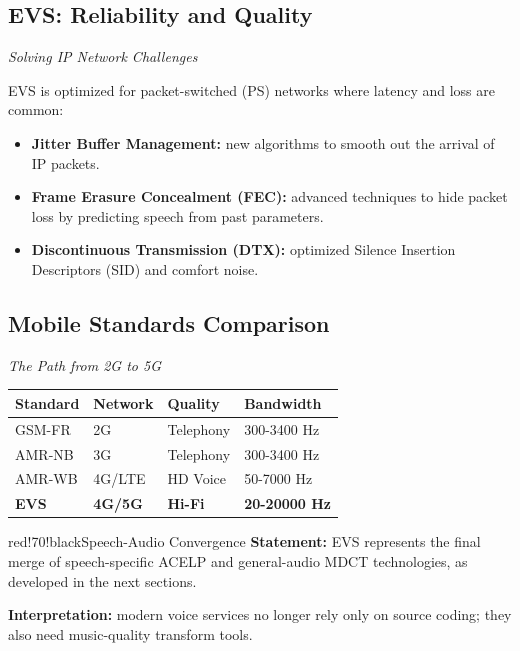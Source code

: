 \subsection{EVS: Reliability and Quality}

\textit{Solving IP Network Challenges}

EVS is optimized for packet-switched (PS) networks where latency and loss are common:

\begin{itemize}
\item \textbf{Jitter Buffer Management:} new algorithms to smooth out the arrival of IP packets.
\item \textbf{Frame Erasure Concealment (FEC):} advanced techniques to hide packet loss by predicting speech from past parameters.
\item \textbf{Discontinuous Transmission (DTX):} optimized Silence Insertion Descriptors (SID) and comfort noise.
\end{itemize}

\subsection{Mobile Standards Comparison}

\textit{The Path from 2G to 5G}

\begin{center}
\begin{tabular}{|l|l|l|l|}
\hline
\textbf{Standard} & \textbf{Network} & \textbf{Quality} & \textbf{Bandwidth} \\ \hline
GSM-FR & 2G & Telephony & 300-3400 Hz \\ \hline
AMR-NB & 3G & Telephony & 300-3400 Hz \\ \hline
AMR-WB & 4G/LTE & HD Voice & 50-7000 Hz \\ \hline
\textbf{EVS} & \textbf{4G/5G} & \textbf{Hi-Fi} & \textbf{20-20000 Hz} \\ \hline
\end{tabular}
\end{center}

\begin{calloutbox}{red!70!black}{Speech-Audio Convergence}
\textbf{Statement:} EVS represents the final merge of speech-specific ACELP and general-audio MDCT technologies, as developed in the next sections.

\textbf{Interpretation:} modern voice services no longer rely only on source coding; they also need music-quality transform tools.
\end{calloutbox}

